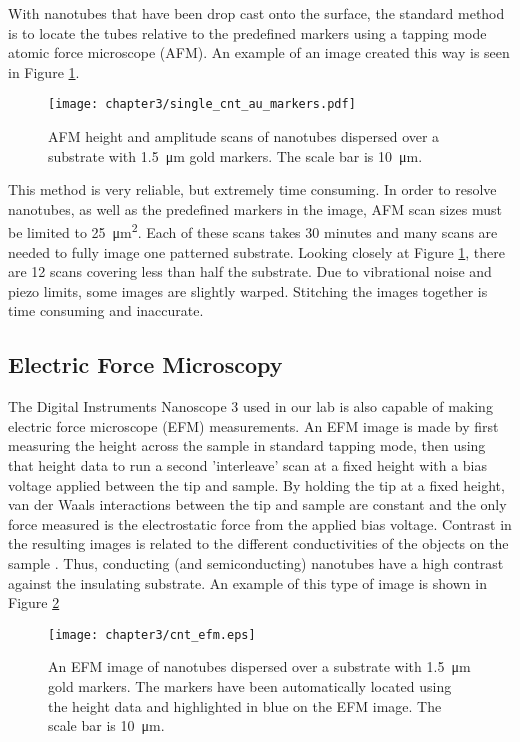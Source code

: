 With nanotubes that have been drop cast onto the surface, the standard method is to locate the tubes relative to the predefined markers using a tapping mode atomic force microscope (AFM). An example of an image created this way is seen in Figure \ref{fig:cnt_au_markers}. 

\begin{figure}
	\centering
	\texttt{[image: chapter3/single\_cnt\_au\_markers.pdf]}
	\caption{AFM height and amplitude scans of nanotubes dispersed over a substrate with \SI{1.5}{\micro\meter} gold markers. The scale bar is \SI{10}{\micro\meter}.}
	\label{fig:cnt_au_markers}
\end{figure}

This method is very reliable, but extremely time consuming. In order to resolve nanotubes, as well as the predefined markers in the image, AFM scan sizes must be limited to \SI{25}{\square\micro\meter}. Each of these scans takes 30 minutes and many scans are needed to fully image one patterned substrate. Looking closely at Figure \ref{fig:cnt_au_markers}, there are 12 scans covering less than half the substrate. Due to vibrational noise and piezo limits, some images are slightly warped. Stitching the images together is time consuming and inaccurate.

\subsection{Electric Force Microscopy}
\label{subsec:EFM}

The Digital Instruments Nanoscope 3 used in our lab is also capable of making electric force microscope (EFM) measurements. An EFM image is made by first measuring the height across the sample in standard tapping mode, then using that height data to run a second 'interleave' scan at a fixed height with a bias voltage applied between the tip and sample. By holding the tip at a fixed height, van der Waals interactions between the tip and sample are constant and the only force measured is the electrostatic force from the applied bias voltage. Contrast in the resulting images is related to the different conductivities of the objects on the sample \cite{Bockrath2002}. Thus, conducting (and semiconducting) nanotubes have a high contrast against the insulating  substrate. An example of this type of image is shown in Figure \ref{fig:cnt_efm}

\begin{figure}
	\centering
	\texttt{[image: chapter3/cnt\_efm.eps]}
	\caption{An EFM image of nanotubes dispersed over a substrate with \SI{1.5}{\micro\meter} gold markers. The markers have been automatically located using the height data and highlighted in blue on the EFM image. The scale bar is \SI{10}{\micro\meter}.}
	\label{fig:cnt_efm}
\end{figure}


